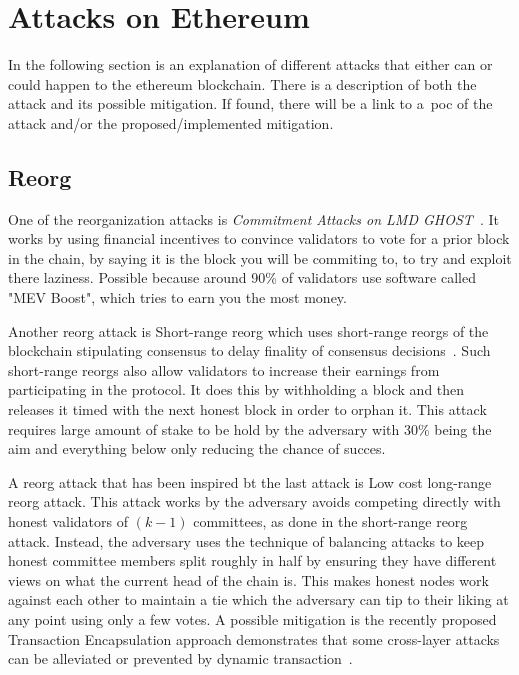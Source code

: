 
\section{Attacks on Ethereum}\label{sec:attacks-on-ethereum}
In the following section is an explanation of different attacks
that either can or could happen to the ethereum blockchain.
There is a description of both the attack and its possible mitigation.
If found, there will be a link to a~\gls{poc} of the attack and/or the proposed/implemented mitigation.
\subsection{Reorg}\label{subsec:reorg}
One of the reorganization attacks is \textit{Commitment Attacks on LMD GHOST}~\cite{sarenche2024breakingbalancepowercommitment}.
It works by using financial incentives to convince validators to vote for a prior block in the chain, by saying it is the block you will be commiting to, to try and exploit there laziness.
Possible because around 90\% of validators use software called "MEV Boost", which tries to earn you the most money.

Another reorg attack is Short-range reorg which uses short-range reorgs of the blockchain stipulating consensus to delay finality of consensus decisions~\cite{10.1007/978-3-031-18283-9_28}.
Such short-range reorgs also allow validators to increase their earnings from participating in the protocol.
It does this by withholding a block and then releases it timed with the next honest block in order to orphan it.
This attack requires large amount of stake to be hold by the adversary with 30\% being the aim and everything below only reducing the chance of succes.

A reorg attack that has been inspired bt the last attack is Low cost long-range reorg attack\cite{10.1007/978-3-031-18283-9_28}.
This attack works by the adversary avoids competing directly with honest validators of $(k - 1)$ committees, as done in the short-range reorg attack.
Instead, the adversary uses the technique of balancing attacks to keep honest committee members split roughly in half by ensuring they have different views on what the current head of the chain is.
This makes honest nodes work against each other to maintain a tie which the adversary can tip to their liking at any point using only a few votes.
A possible mitigation is the recently proposed Transaction Encapsulation approach demonstrates that some cross-layer attacks can be alleviated or prevented by dynamic transaction~.

